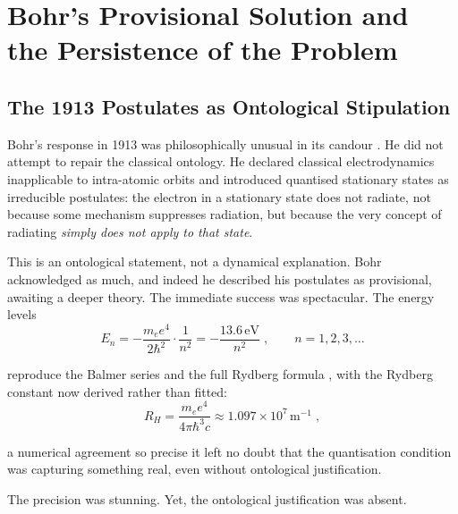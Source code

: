 \section{Bohr's Provisional Solution and the Persistence of the Problem}
\label{section:bohr}

\subsection{The 1913 Postulates as Ontological Stipulation}

Bohr's response in 1913 was philosophically unusual in its candour \cite{bohr_1913_constitution}. He did not attempt to repair the classical ontology. He declared classical electrodynamics inapplicable to intra-atomic orbits and introduced quantised stationary states as irreducible postulates: the electron in a stationary state does not radiate, not because some mechanism suppresses radiation, but because the very concept of radiating \textit{simply does not apply to that state}.

\medskip

This is an ontological statement, not a dynamical explanation. Bohr acknowledged as much, and indeed he described his postulates as provisional, awaiting a deeper theory. The immediate success was spectacular. The energy levels
\begin{equation}
  E_n = -\frac{m_e e^4}{2\hbar^2}\cdot\frac{1}{n^2} = -\frac{13.6\,\mathrm{eV}}{n^2} \; , \qquad n = 1, 2, 3, \ldots
  \label{eq:bohr-levels}
\end{equation}

reproduce the Balmer series \cite{balmer_1885_spectrallinien} and the full Rydberg formula \cite{rydberg_1888_linespectra}, with the Rydberg constant now derived rather than fitted:
\begin{equation}
  R_H = \frac{m_e e^4}{4\pi\hbar^3 c} \approx 1.097\times10^7\,\mathrm{m}^{-1} \; ,
\end{equation}

a numerical agreement so precise it left no doubt that the quantisation condition was capturing something real, even without ontological justification.

\medskip

The precision was stunning. Yet, the ontological justification was absent.

